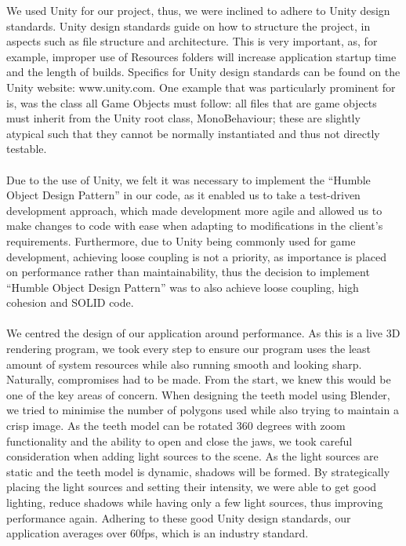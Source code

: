\documentclass[11pt,english, titlepage]{article}
\begin{document}
      We used Unity for our project, thus, we were inclined to adhere to Unity design standards. Unity design standards guide on how to structure the project, in aspects such as file structure and architecture. This is very important, as, for example, improper use of Resources folders will increase application startup time and the length of builds. Specifics for Unity design standards can be found on the Unity website: www.unity.com.
      One example that was particularly prominent for is, was the class all Game Objects must follow: all files that are game objects must inherit from the Unity root class, MonoBehaviour; these are slightly atypical such that they cannot be normally instantiated and thus not directly testable. \\
      \\
      Due to the use of Unity, we felt it was necessary to implement the ``Humble Object Design Pattern'' in our code, as it enabled us to take a test-driven development approach, which made development more agile and allowed us to make changes to code with ease when adapting to modifications in the client's requirements. Furthermore, due to Unity being commonly used for game development, achieving loose coupling is not a priority, as importance is placed on performance rather than maintainability, thus the decision to implement ``Humble Object Design Pattern'' was to also achieve loose coupling, high cohesion and SOLID code. \\
      \\
      We centred the design of our application around performance. As this is a live 3D rendering program, we took every step to ensure our program uses the least amount of system resources while also running smooth and looking sharp. Naturally, compromises had to be made. From the start, we knew this would be one of the key areas of concern. When designing the teeth model using Blender, we tried to minimise the number of polygons used while also trying to maintain a crisp image. As the teeth model can be rotated 360 degrees with zoom functionality and the ability to open and close the jaws, we took careful consideration when adding light sources to the scene. As the light sources are static and the teeth model is dynamic, shadows will be formed. By strategically placing the light sources and setting their intensity, we were able to get good lighting, reduce shadows while having only a few light sources, thus improving performance again. Adhering to these good Unity design standards, our application averages over 60fps, which is an industry standard.
\end{document}
